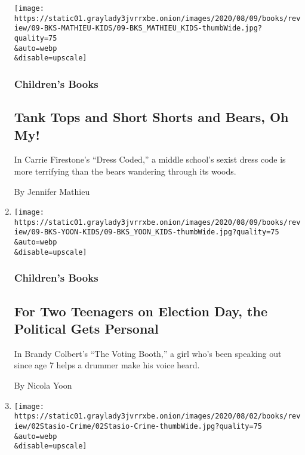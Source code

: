 \begin{enumerate}
  \texttt{[image: https://static01.graylady3jvrrxbe.onion/images/2020/08/09/books/review/09-BKS-MATHIEU-KIDS/09-BKS\_MATHIEU\_KIDS-thumbWide.jpg?quality=75\\\&auto=webp\\\&disable=upscale]}

  \hypertarget{childrens-books}{%
  \subsubsection{Children's Books}\label{childrens-books}}

  \hypertarget{tank-tops-and-short-shorts-and-bears-oh-my}{%
  \subsection{Tank Tops and Short Shorts and Bears, Oh
  My!}\label{tank-tops-and-short-shorts-and-bears-oh-my}}

  In Carrie Firestone's ``Dress Coded,'' a middle school's sexist dress
  code is more terrifying than the bears wandering through its woods.

  By Jennifer Mathieu
\item
  \href{/2020/08/01/books/review/brandy-colbert-the-voting-booth.html}{}

  \texttt{[image: https://static01.graylady3jvrrxbe.onion/images/2020/08/09/books/review/09-BKS-YOON-KIDS/09-BKS\_YOON\_KIDS-thumbWide.jpg?quality=75\\\&auto=webp\\\&disable=upscale]}

  \hypertarget{childrens-books-1}{%
  \subsubsection{Children's Books}\label{childrens-books-1}}

  \hypertarget{for-two-teenagers-on-election-day-the-political-gets-personal}{%
  \subsection{For Two Teenagers on Election Day, the Political Gets
  Personal}\label{for-two-teenagers-on-election-day-the-political-gets-personal}}

  In Brandy Colbert's ``The Voting Booth,'' a girl who's been speaking
  out since age 7 helps a drummer make his voice heard.

  By Nicola Yoon
\item
  \href{/2020/07/31/books/review/crime-fiction-megan-miranda.html}{}

  \texttt{[image: https://static01.graylady3jvrrxbe.onion/images/2020/08/02/books/review/02Stasio-Crime/02Stasio-Crime-thumbWide.jpg?quality=75\\\&auto=webp\\\&disable=upscale]}


\end{enumerate}
